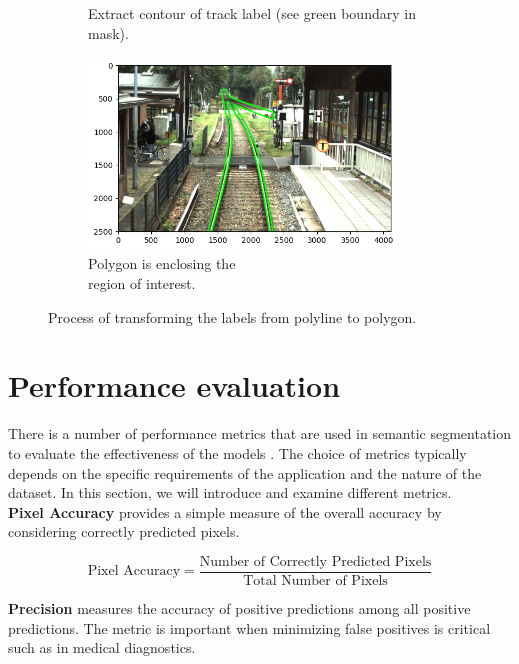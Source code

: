 \documentclass[Master,MDS,english]{BASE/twbook} %
\begin{document}
\begin{figure}
\begin{subfigure}{.5\textwidth}
  \caption{Extract contour of track label (see green boundary in mask).}
\end{subfigure}%
\begin{subfigure}{.5\textwidth}
  \centering
  \includegraphics[width=0.9\textwidth]{images/labeling/final}
  \caption{Polygon is enclosing the \\ region of interest.}
\end{subfigure}
\caption{Process of transforming the labels from  polyline to polygon.}
\label{fig:labeling}
\end{figure}




\section{Performance evaluation}

There is a number of performance metrics that are used in semantic segmentation to evaluate the effectiveness of the models \citep{Taha2015}. The choice of metrics typically depends on the specific requirements of the application and the nature of the dataset. In this section, we will introduce and examine different metrics. \\


\noindent\textbf{Pixel Accuracy} provides a simple measure of the overall accuracy by considering correctly predicted pixels. 


\[
\text{Pixel Accuracy} = \frac{\text{Number of Correctly Predicted Pixels}}{\text{Total Number of Pixels}}
\]

\noindent\textbf{Precision} measures the accuracy of positive predictions among all positive predictions. The metric is important when minimizing false positives is critical such as in medical diagnostics.
\end{document}
